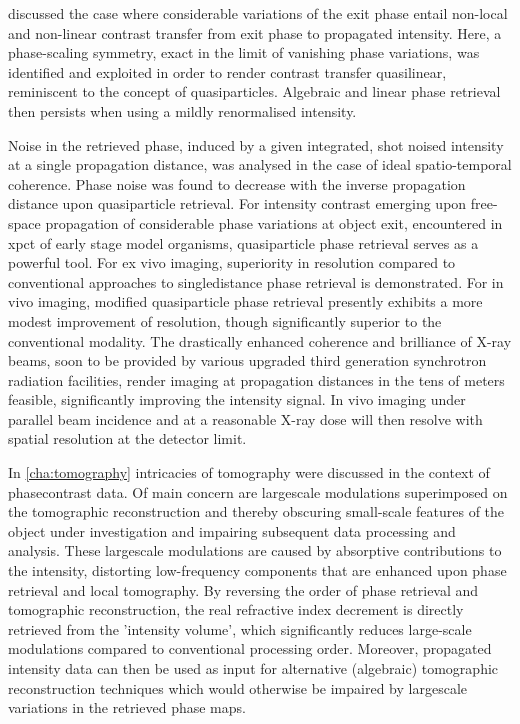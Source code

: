\documentclass[
twoside,
openright,
titlepage,
numbers=noenddot,
headinclude,
fleqn,
a4paper,
footinclude=true,
cleardoublepage=empty,
abstractoff,
BCOR=5mm,
paper=a4,
fontsize=11pt,
british,ngerman,american,
]{scrreprt}
\begin{document}
 discussed the case where considerable variations of the
exit phase entail non-local and non-linear contrast transfer from exit
phase to propagated intensity.  Here, a phase-scaling symmetry, exact
in the limit of vanishing phase variations, was identified and
exploited in order to render contrast transfer quasi\hyph linear,
reminiscent to the concept of quasiparticles.  Algebraic and linear
phase retrieval then persists when using a mildly renormalised
intensity.

Noise in the retrieved phase, induced by a given integrated, shot\hyph
noised intensity at a single propagation distance, was analysed in the
case of ideal spatio-temporal coherence.  Phase noise was found to
decrease with the inverse propagation distance upon quasiparticle
retrieval.  For intensity contrast emerging upon free-space
propagation of considerable phase variations at object exit,
encountered \eg{} in \acl{xpct} of early stage model organisms,
quasiparticle phase retrieval serves as a powerful tool.  For ex vivo
imaging, superiority in resolution compared to conventional approaches
to single\hyph distance phase retrieval is demonstrated.  For in vivo
imaging, modified quasiparticle phase retrieval presently exhibits a
more modest improvement of resolution, though significantly superior
to the conventional modality.  The drastically enhanced coherence and
brilliance of X-ray beams, soon to be provided by various upgraded
third generation synchrotron radiation facilities, render imaging at
propagation distances in the tens of meters feasible, significantly
improving the intensity signal.  In vivo imaging under parallel\hyph
beam incidence and at a reasonable X-ray dose will then resolve with
spatial resolution at the detector limit.


In \cref{cha:tomography} intricacies of tomography were discussed in
the context of phase\hyph contrast data.  Of main concern are
large\hyph scale modulations superimposed on the tomographic
reconstruction and thereby obscuring small-scale features of the
object under investigation and impairing subsequent data processing
and analysis.  These large\hyph scale modulations are caused by
absorptive contributions to the intensity, distorting low-frequency
components that are enhanced upon phase retrieval and local
tomography.  By reversing the order of phase retrieval and tomographic
reconstruction, the real refractive index decrement is directly
retrieved from the 'intensity volume', which significantly reduces
large-scale modulations compared to conventional processing order.
Moreover, propagated intensity data can then be used as input for
alternative (algebraic) tomographic reconstruction techniques
which would otherwise be impaired by large\hyph scale variations in
the retrieved phase maps.
\end{document}
